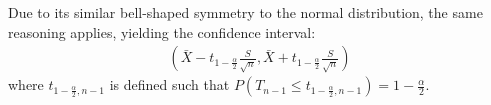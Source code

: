 \begin{enumerate}
    Due to its similar bell-shaped symmetry to the normal distribution, the same reasoning applies, yielding the confidence interval:
    \begin{gather*}
        (\bar{X} - t_{1 - \frac{\alpha}{2}}\frac{S}{\sqrt{n}}, \bar{X} + t_{1 - \frac{\alpha}{2}}\frac{S}{\sqrt{n}})
    \end{gather*}
    where \( t_{1 - \frac{\alpha}{2}, n - 1} \) is defined such that \( P(T_{n - 1} \leq t_{1 - \frac{\alpha}{2}, n - 1}) = 1 - \frac{\alpha}{2} \).
\end{enumerate}